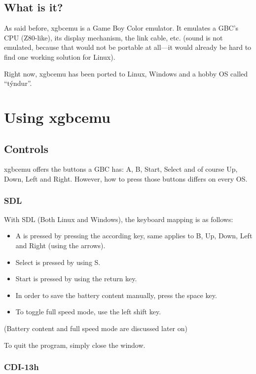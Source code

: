 \documentclass[fleqn,english,openany]{scrbook}
\begin{document}
\section{What is it?}

As said before, xgbcemu is a Game Boy Color emulator. It emulates a GBC's CPU (Z80-like), its display mechanism, the link
cable, etc. (sound is not emulated, because that would not be portable at all---it would already be hard to find one
working solution for Linux).

Right now, xgbcemu has been ported to Linux, Windows and a hobby OS called “týndur”.



\chapter{Using xgbcemu}

\section{Controls}

xgbcemu offers the buttons a GBC has: A, B, Start, Select and of course Up, Down, Left and Right. However, how to press
those buttons differs on every OS.

\subsection{SDL}

With SDL (Both Linux and Windows), the keyboard mapping is as follows:

\begin{itemize}
\item A is pressed by pressing the according key, same applies to B, Up, Down, Left and Right (using the arrows).
\item Select is pressed by using S.
\item Start is pressed by using the return key.
\item In order to save the battery content manually, press the space key.
\item To toggle full speed mode, use the left shift key.
\end{itemize}
(Battery content and full speed mode are discussed later on)

To quit the program, simply close the window.

\subsection{CDI-13h}
\end{document}
